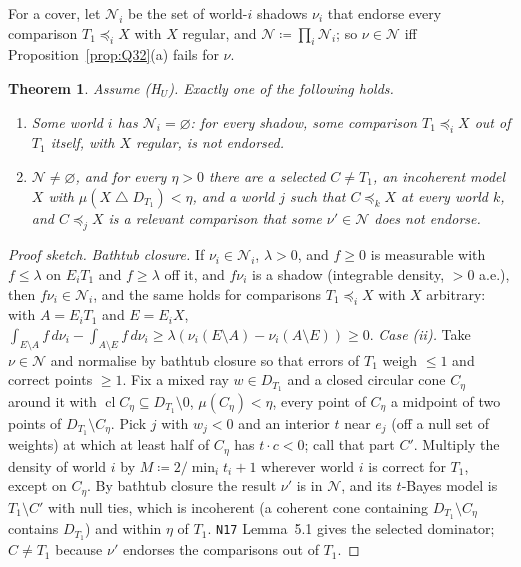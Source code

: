 \documentclass[11pt]{article}
\newtheorem{theorem}{Theorem}[section]
\theoremstyle{definition}
\theoremstyle{remark}
\newcommand{\cl}{\operatorname{cl}}
\newcommand{\sd}{\mathbin{\triangle}}
\newcommand{\src}[1]{\texttt{#1}}
\begin{document}
For a cover, let $\mathcal N_i$ be the set of world-$i$ shadows $\nu_i$ that endorse every comparison $T_1\preceq_iX$ with $X$ regular, and $\mathcal N\coloneqq\prod_i\mathcal N_i$; so $\nu\in\mathcal N$ iff Proposition~\ref{prop:Q32}(a) fails for $\nu$.

\begin{theorem}\label{thm:R3}
Assume (H$_U$). Exactly one of the following holds.
\begin{enumerate}[leftmargin=*,label=(\roman*)]
\item Some world $i$ has $\mathcal N_i=\varnothing$: for every shadow, some comparison $T_1\preceq_iX$ out of $T_1$ itself, with $X$ regular, is not endorsed.
\item $\mathcal N\ne\varnothing$, and for every $\eta>0$ there are a selected $C\ne T_1$, an incoherent model $X$ with $\mu(X\sd D_{T_1})<\eta$, and a world $j$ such that $C\preceq_kX$ at every world $k$, and $C\preceq_jX$ is a relevant comparison that some $\nu'\in\mathcal N$ does not endorse.
\end{enumerate}
\end{theorem}
\begin{proof}[Proof sketch]
\emph{Bathtub closure.} If $\nu_i\in\mathcal N_i$, $\lambda>0$, and $f\ge0$ is measurable with $f\le\lambda$ on $E_iT_1$ and $f\ge\lambda$ off it, and $f\nu_i$ is a shadow (integrable density, $>0$ a.e.), then $f\nu_i\in\mathcal N_i$, and the same holds for comparisons $T_1\preceq_iX$ with $X$ arbitrary: with $A=E_iT_1$ and $E=E_iX$, $\int_{E\setminus A}f\,d\nu_i-\int_{A\setminus E}f\,d\nu_i\ge\lambda(\nu_i(E\setminus A)-\nu_i(A\setminus E))\ge0$. \emph{Case (ii).} Take $\nu\in\mathcal N$ and normalise by bathtub closure so that errors of $T_1$ weigh $\le1$ and correct points $\ge1$. Fix a mixed ray $w\in D_{T_1}$ and a closed circular cone $C_\eta$ around it with $\cl C_\eta\subseteq D_{T_1}\setminus0$, $\mu(C_\eta)<\eta$, every point of $C_\eta$ a midpoint of two points of $D_{T_1}\setminus C_\eta$. Pick $j$ with $w_j<0$ and an interior $t$ near $e_j$ (off a null set of weights) at which at least half of $C_\eta$ has $t\cdot c<0$; call that part $C'$. Multiply the density of world $i$ by $M\coloneqq2/\min_it_i+1$ wherever world $i$ is correct for $T_1$, except on $C_\eta$. By bathtub closure the result $\nu'$ is in $\mathcal N$, and its $t$-Bayes model is $T_1\setminus C'$ with null ties, which is incoherent (a coherent cone containing $D_{T_1}\setminus C_\eta$ contains $D_{T_1}$) and within $\eta$ of $T_1$. \src{N17} Lemma~5.1 gives the selected dominator; $C\ne T_1$ because $\nu'$ endorses the comparisons out of $T_1$.
\end{proof}
\end{document}

